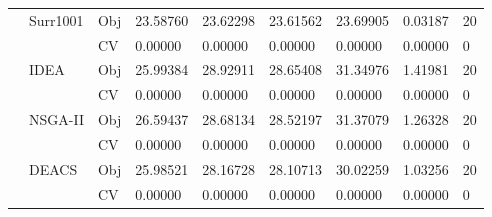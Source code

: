 \begin{table*}[!htb]
\begin{tabular}{lllllllll}
		& Surr1001                           & Obj                                & 23.58760                           & 23.62298                           & 23.61562                             & 23.69905                            & 0.03187                           & 20               \\
		&                                    & CV                                 & 0.00000                            & 0.00000                            & 0.00000                              & 0.00000                             & 0.00000                           & 0                \\
		& IDEA                               & Obj                                & 25.99384                           & 28.92911                           & 28.65408                             & 31.34976                            & 1.41981                           & 20               \\
		&                                    & CV                                 & 0.00000                            & 0.00000                            & 0.00000                              & 0.00000                             & 0.00000                           & 0                \\
		& NSGA-II                            & Obj                                & 26.59437                           & 28.68134                           & 28.52197                             & 31.37079                            & 1.26328                           & 20               \\
		&                                    & CV                                 & 0.00000                            & 0.00000                            & 0.00000                              & 0.00000                             & 0.00000                           & 0                \\
		& DEACS                              & Obj                                & 25.98521                           & 28.16728                           & 28.10713                             & 30.02259                            & 1.03256                           & 20               \\
		&                                    & CV                                 & 0.00000                            & 0.00000                            & 0.00000                              & 0.00000                             & 0.00000                           & 0                \\

\end{tabular}
\end{table*}
